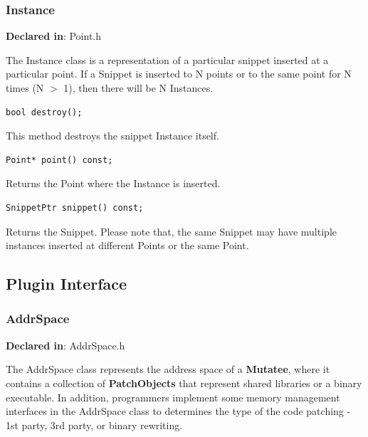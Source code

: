 \documentclass[11pt]{article}
\begin{document}
\subsubsection{Instance}
\label{sec-3.1.3}

\textbf{Declared in}: Point.h

The Instance class is a representation of a particular snippet inserted at a
particular point. If a Snippet is inserted to N points or to the same point for
N times (N $>$ 1), then there will be N Instances.


\begin{verbatim}
bool destroy();

\end{verbatim}



This method destroys the snippet Instance itself.


\begin{verbatim}
Point* point() const;

\end{verbatim}



Returns the Point where the Instance is inserted.


\begin{verbatim}
SnippetPtr snippet() const;

\end{verbatim}



Returns the Snippet. Please note that, the same Snippet may have multiple
instances inserted at different Points or the same Point.

\subsection{Plugin Interface}
\label{sec-3.2}

\subsubsection{AddrSpace}
\label{sec-3.2.1}

\textbf{Declared in}: AddrSpace.h

The AddrSpace class represents the address space of a \textbf{Mutatee}, where it
contains a collection of \textbf{PatchObjects} that represent shared libraries or a
binary executable. In addition, programmers implement some memory management
interfaces in the AddrSpace class to determines the type of the code patching -
1st party, 3rd party, or binary rewriting.
\end{document}
